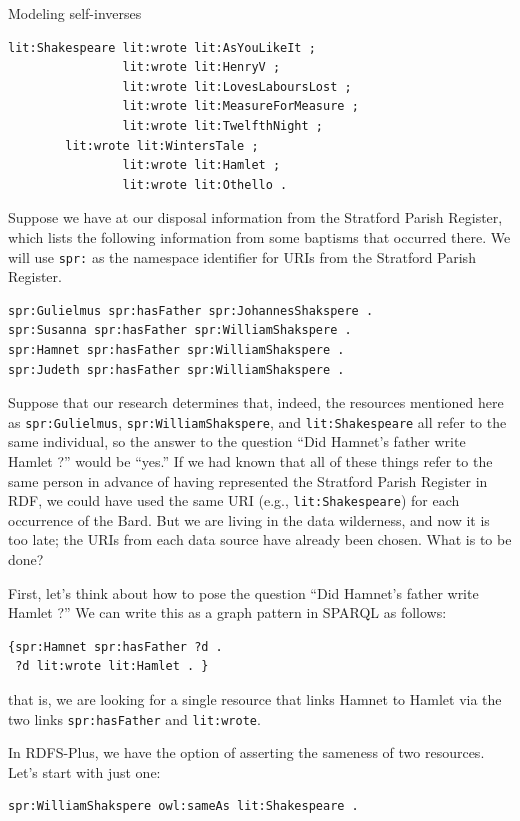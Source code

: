 \begin{challenge}{Modeling self-inverses}
\begin{lstlisting}
lit:Shakespeare lit:wrote lit:AsYouLikeIt ;
                lit:wrote lit:HenryV ;
                lit:wrote lit:LovesLaboursLost ;
                lit:wrote lit:MeasureForMeasure ; 
                lit:wrote lit:TwelfthNight ;
		lit:wrote lit:WintersTale ; 
                lit:wrote lit:Hamlet ;
                lit:wrote lit:Othello .
\end{lstlisting}

Suppose we have at our disposal information from the Stratford Parish
Register, which lists the following information from some baptisms that
occurred there. We will use \texttt{spr:} as the namespace identifier for URIs
from the Stratford Parish Register.

\begin{lstlisting}
spr:Gulielmus spr:hasFather spr:JohannesShakspere .
spr:Susanna spr:hasFather spr:WilliamShakspere .
spr:Hamnet spr:hasFather spr:WilliamShakspere .
spr:Judeth spr:hasFather spr:WilliamShakspere .
\end{lstlisting}

Suppose that our research determines that, indeed, the resources
mentioned here as \texttt{spr:Gulielmus}, \texttt{spr:WilliamShakspere}, and
\texttt{lit:Shakespeare} all refer to the same individual, so the answer to the
question ``Did Hamnet's father write Hamlet ?'' would be ``yes.'' If we
had known that all of these things refer to the same person in advance
of having represented the Stratford Parish Register in RDF, we could
have used the same URI (e.g., \texttt{lit:Shakespeare}) for
each occurrence of the Bard. But we are living in the data wilderness,
and now it is too late; the URIs from each data source have already been
chosen. What is to be done?

First, let's think about how to pose the question ``Did Hamnet's father
write Hamlet ?'' We can write this as a graph pattern in SPARQL as
follows:

\begin{lstlisting}
{spr:Hamnet spr:hasFather ?d .
 ?d lit:wrote lit:Hamlet . }
\end{lstlisting}

that is, we are looking for a single resource that links Hamnet to
Hamlet via the two links
\texttt{spr:hasFather} and \texttt{lit:wrote}.


In RDFS-Plus, we have the option of asserting the sameness of two
resources. Let's start with just one:

\begin{lstlisting}
spr:WilliamShakspere owl:sameAs lit:Shakespeare .
\end{lstlisting}


\end{challenge}
